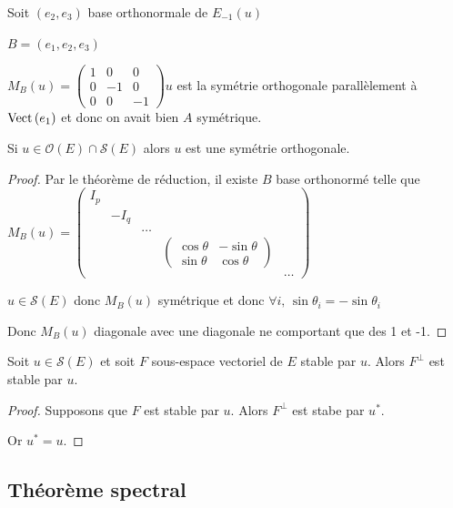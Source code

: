 \begin{exemple}
    Soit $(e_2, e_3)$ base orthonormale de $E_{-1}(u)$

    $B = (e_1, e_2, e_3)$

    $M_B(u) = \begin{pmatrix}
        1 & 0 & 0 \\
        0 & -1 & 0 \\
        0 & 0 & -1
    \end{pmatrix}$$u$ est la symétrie orthogonale parallèlement à $\operatorname{Vect} \, (e_1)$ et donc 
    on avait bien $A$ symétrique. 
\end{exemple}

\begin{remarque}
    Si $u \in \mathcal O(E) \cap \mathscr S(E)$ alors $u$ est une symétrie orthogonale. 
\end{remarque}

\begin{proof}
    Par le théorème de réduction, il existe $B$ base orthonormé telle que 
    $M_B(u) = \begin{pmatrix}
        I_p & & & & \\
        & - I_q & & & \\
        & & \dots & & \\
        & & & \begin{pmatrix}
            \cos \theta & - \sin \theta \\
            \sin \theta & \cos \theta 
        \end{pmatrix} & \\
        & & & & \dots 
    \end{pmatrix}$

    $u \in \mathscr S(E)$ donc $M_B(u)$ symétrique et donc 
    $\forall i, \, \sin \theta_i = - \sin \theta_i$

    Donc $M_B(u)$  diagonale avec une diagonale ne comportant que des 1 et -1. 
\end{proof}

\begin{proposition}{}{}
    Soit $u \in \mathscr S(E)$ et soit $F$ sous-espace vectoriel de $E$ stable par $u$. 
    Alors $F^\perp$ est stable par $u$. 
\end{proposition}

\begin{proof}
    Supposons que $F$ est stable par $u$. Alors $F^\perp$ est stabe par $u^*$. 

    Or $u^* = u$. 
\end{proof}

\subsection{Théorème spectral}

